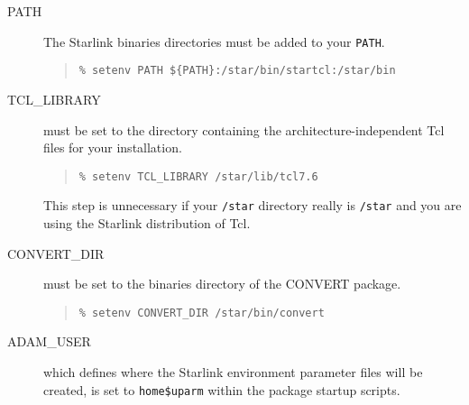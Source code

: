 \documentclass[twoside,11pt]{article}
\begin{document}
\begin{description}
\item[PATH] The Starlink binaries directories must be added to your 
\texttt{PATH}.
\begin{quote} \begin{verbatim}
% setenv PATH ${PATH}:/star/bin/startcl:/star/bin
\end{verbatim} \end{quote}

\item[TCL\_LIBRARY] must be set to the directory containing the 
architecture-independent Tcl files for your installation.
\begin{quote} \begin{verbatim}
% setenv TCL_LIBRARY /star/lib/tcl7.6
\end{verbatim} \end{quote}
This step is unnecessary if your \texttt{/star} directory really is 
\texttt{/star} 
and you are using the Starlink distribution of Tcl.

\item[CONVERT\_DIR] must be set to the binaries directory of
the CONVERT package.
\begin{quote} \begin{verbatim}
% setenv CONVERT_DIR /star/bin/convert
\end{verbatim} \end{quote}

\item[ADAM\_USER] which defines where the Starlink environment 
parameter files will be created, is set to \texttt{home\$uparm} within the 
package startup scripts.

\end{description}
\end{document}
